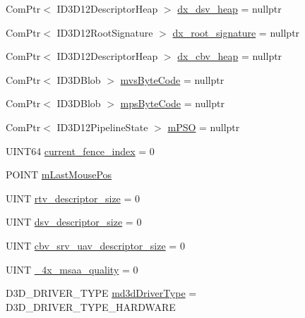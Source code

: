 \begin{DoxyCompactItemize}
\item 
Com\+Ptr$<$ I\+D3\+D12\+Descriptor\+Heap $>$ \hyperlink{class_direct_x_renderer_ae865e29f2c2084f98b095b8b60fbeef2_ae865e29f2c2084f98b095b8b60fbeef2}{dx\+\_\+dsv\+\_\+heap} = nullptr
\item 
Com\+Ptr$<$ I\+D3\+D12\+Root\+Signature $>$ \hyperlink{class_direct_x_renderer_a36476b689f10a35b756e083320a13634_a36476b689f10a35b756e083320a13634}{dx\+\_\+root\+\_\+signature} = nullptr
\item 
Com\+Ptr$<$ I\+D3\+D12\+Descriptor\+Heap $>$ \hyperlink{class_direct_x_renderer_a2aaa7a57aea5c65a3381e54513ed7ff2_a2aaa7a57aea5c65a3381e54513ed7ff2}{dx\+\_\+cbv\+\_\+heap} = nullptr
\item 
Com\+Ptr$<$ I\+D3\+D\+Blob $>$ \hyperlink{class_direct_x_renderer_a795777c3f460bc862af3d8be68db0826_a795777c3f460bc862af3d8be68db0826}{mvs\+Byte\+Code} = nullptr
\item 
Com\+Ptr$<$ I\+D3\+D\+Blob $>$ \hyperlink{class_direct_x_renderer_ae01efa1365005bd544950fcbccfe6b47_ae01efa1365005bd544950fcbccfe6b47}{mps\+Byte\+Code} = nullptr
\item 
Com\+Ptr$<$ I\+D3\+D12\+Pipeline\+State $>$ \hyperlink{class_direct_x_renderer_a99d57c8ad110aeee5347e4a0baf28ae5_a99d57c8ad110aeee5347e4a0baf28ae5}{m\+P\+SO} = nullptr
\item 
U\+I\+N\+T64 \hyperlink{class_direct_x_renderer_a373ab38c7d919ae26c2d3148ab126538_a373ab38c7d919ae26c2d3148ab126538}{current\+\_\+fence\+\_\+index} = 0
\item 
P\+O\+I\+NT \hyperlink{class_direct_x_renderer_a11a4b47ed4a944b8671ccbda8698780a_a11a4b47ed4a944b8671ccbda8698780a}{m\+Last\+Mouse\+Pos}
\item 
U\+I\+NT \hyperlink{class_direct_x_renderer_a192899db0ebd9b8632fe9300f02b226a_a192899db0ebd9b8632fe9300f02b226a}{rtv\+\_\+descriptor\+\_\+size} = 0
\item 
U\+I\+NT \hyperlink{class_direct_x_renderer_a0b16f02604e3f5cf4e55321d01e4bd9d_a0b16f02604e3f5cf4e55321d01e4bd9d}{dsv\+\_\+descriptor\+\_\+size} = 0
\item 
U\+I\+NT \hyperlink{class_direct_x_renderer_ad2737cb5c487cbec53f3cd4ce74ff386_ad2737cb5c487cbec53f3cd4ce74ff386}{cbv\+\_\+srv\+\_\+uav\+\_\+descriptor\+\_\+size} = 0
\item 
U\+I\+NT \hyperlink{class_direct_x_renderer_acb6551e975a75635b5b3b652fb5c0837_acb6551e975a75635b5b3b652fb5c0837}{\+\_\+4x\+\_\+msaa\+\_\+quality} = 0
\item 
D3\+D\+\_\+\+D\+R\+I\+V\+E\+R\+\_\+\+T\+Y\+PE \hyperlink{class_direct_x_renderer_a34c803e7e620ca5b73fe994fd278611c_a34c803e7e620ca5b73fe994fd278611c}{md3d\+Driver\+Type} = D3\+D\+\_\+\+D\+R\+I\+V\+E\+R\+\_\+\+T\+Y\+P\+E\+\_\+\+H\+A\+R\+D\+W\+A\+RE

\end{DoxyCompactItemize}
